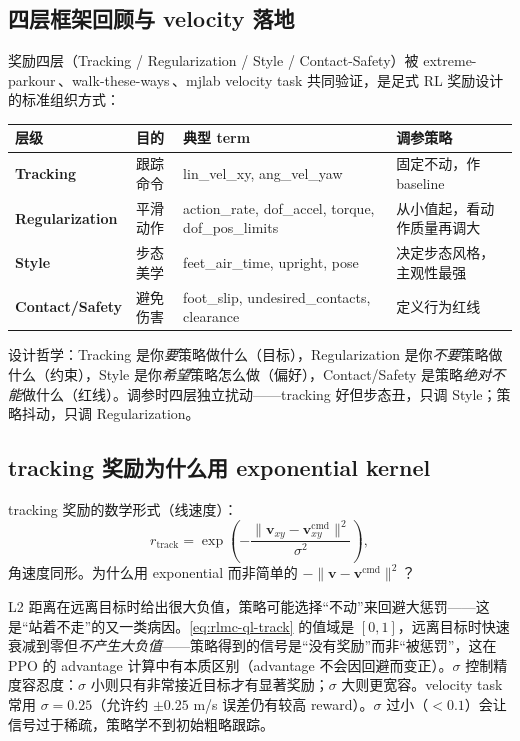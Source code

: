 \subsection{四层框架回顾与 velocity 落地}
\label{sec:rlmc-ql-reward-layers}

奖励四层（Tracking / Regularization / Style / Contact-Safety）被 extreme-parkour\,\cite{cheng2024parkour}、walk-these-ways\,\cite{margolis2022walk}、mjlab velocity task 共同验证，是足式 RL 奖励设计的标准组织方式：

\begin{center}
\small
\begin{tabular}{@{}lllp{3.5cm}@{}}
\toprule
层级 & 目的 & 典型 term & 调参策略 \\
\midrule
\textbf{Tracking} & 跟踪命令 & lin\_vel\_xy, ang\_vel\_yaw & 固定不动，作 baseline \\
\textbf{Regularization} & 平滑动作 & action\_rate, dof\_accel, torque, dof\_pos\_limits & 从小值起，看动作质量再调大 \\
\textbf{Style} & 步态美学 & feet\_air\_time, upright, pose & 决定步态风格，主观性最强 \\
\textbf{Contact/Safety} & 避免伤害 & foot\_slip, undesired\_contacts, clearance & 定义行为红线 \\
\bottomrule
\end{tabular}
\end{center}

设计哲学：Tracking 是你\emph{要}策略做什么（目标），Regularization 是你\emph{不要}策略做什么（约束），Style 是你\emph{希望}策略怎么做（偏好），Contact/Safety 是策略\emph{绝对不能}做什么（红线）。调参时四层独立扰动——tracking 好但步态丑，只调 Style；策略抖动，只调 Regularization。

\subsection{tracking 奖励为什么用 exponential kernel}
\label{sec:rlmc-ql-reward-track}

tracking 奖励的数学形式（线速度）：
\begin{equation}
r_{\text{track}} = \exp\!\left(-\frac{\lVert \mathbf{v}_{xy} - \mathbf{v}^{\text{cmd}}_{xy} \rVert^2}{\sigma^2}\right),
\label{eq:rlmc-ql-track}
\end{equation}
角速度同形。为什么用 exponential 而非简单的 $-\lVert \mathbf{v}-\mathbf{v}^{\text{cmd}}\rVert^2$？

\begin{insight}\label{ins:rlmc-ql-expkernel}
L2 距离在远离目标时给出很大负值，策略可能选择“不动”来回避大惩罚——这是“站着不走”的又一类病因。\eqref{eq:rlmc-ql-track} 的值域是 $[0,1]$，远离目标时快速衰减到零但\emph{不产生大负值}——策略得到的信号是“没有奖励”而非“被惩罚”，这在 PPO 的 advantage 计算中有本质区别（advantage 不会因回避而变正）。$\sigma$ 控制精度容忍度：$\sigma$ 小则只有非常接近目标才有显著奖励；$\sigma$ 大则更宽容。velocity task 常用 $\sigma=0.25$（允许约 $\pm 0.25$ m/s 误差仍有较高 reward）。$\sigma$ 过小（$<0.1$）会让信号过于稀疏，策略学不到初始粗略跟踪。
\end{insight}

